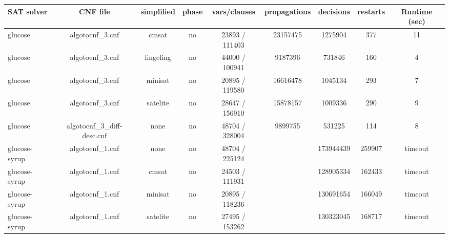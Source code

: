 \begin{appendices}
\begin{table}[p]
  \begin{center}
    \begin{tabular}{l|cccccccc}
        \textbf{SAT solver} & \textbf{CNF file} & \textbf{simplified} & \textbf{phase} & \textbf{vars/clauses} & \textbf{propagations} & \textbf{decisions} & \textbf{restarts} & \textbf{Runtime (sec)} \\
      \hline
  glucose                        & algotocnf\_3.cnf               & cmsat      & no    & 23893 / 111403 & 23157475  & 1275904   & 377        & 11 \\ %
  glucose                        & algotocnf\_3.cnf               & lingeling  & no    & 44000 / 100941 & 9187396   & 731846    & 160        & 4 \\ %
  glucose                        & algotocnf\_3.cnf               & minisat    & no    & 20895 / 119580 & 16616478  & 1045134   & 293        & 7 \\ %
  glucose                        & algotocnf\_3.cnf               & satelite   & no    & 28647 / 156910 & 15878157  & 1009336   & 290        & 9 \\ %
  glucose                        & algotocnf\_3\_diff-desc.cnf    & none       & no    & 48704 / 328004 & 9899755   & 531225    & 114        & 8 \\ %
  glucose-syrup                  & algotocnf\_1.cnf               & none       & no    & 48704 / 225124 &           & 173944439 & 259907     & timeout \\ %
  glucose-syrup                  & algotocnf\_1.cnf               & cmsat      & no    & 24503 / 111931 &           & 128905334 & 162433     & timeout \\ %
  glucose-syrup                  & algotocnf\_1.cnf               & minisat    & no    & 20895 / 118236 &           & 130691654 & 166049     & timeout \\ %
  glucose-syrup                  & algotocnf\_1.cnf               & satelite   & no    & 27495 / 153262 &           & 130323045 & 168717     & timeout \\ %

\end{tabular}
\end{center}
\end{table}
\end{appendices}
